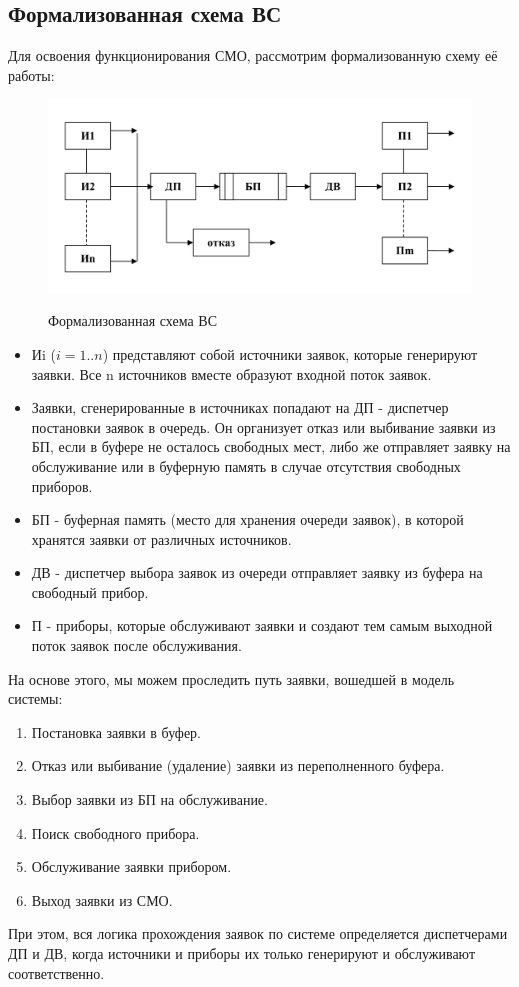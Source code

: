\documentclass[a4paper, 14pt]{article}
\begin{document}
\subsection{Формализованная схема ВС}
Для освоения функционирования СМО, рассмотрим формализованную схему её работы:
\begin{figure}[H]
	\centering
	\includegraphics[width=15cm,height=\textheight,keepaspectratio]{smo.png}\\
	\caption{Формализованная схема ВС}
\end{figure}

\begin{itemize}
	\item Иi ($i=1..n$) представляют собой источники заявок, которые генерируют заявки. Все n источников вместе образуют входной поток заявок.
	\item Заявки, сгенерированные в источниках попадают на ДП - диспетчер постановки заявок в очередь. Он организует отказ или выбивание заявки из БП, если в буфере не осталось свободных мест, либо же отправляет заявку на обслуживание или в буферную память в случае отсутствия свободных приборов.
	\item БП - буферная память (место для хранения очереди заявок),  в которой хранятся заявки от различных источников.
	\item ДВ - диспетчер выбора заявок из очереди отправляет заявку из буфера на свободный прибор.
	\item П - приборы, которые обслуживают заявки и создают тем самым выходной поток заявок после обслуживания.
\end{itemize}

На основе этого, мы можем проследить путь заявки, вошедшей в модель системы:
\begin{enumerate}
	\item Постановка заявки в буфер.
	\item Отказ или выбивание (удаление) заявки из переполненного буфера.
	\item Выбор заявки из БП на обслуживание.
	\item Поиск свободного прибора.
	\item Обслуживание заявки прибором.
	\item Выход заявки из СМО.
\end{enumerate}
При этом, вся логика прохождения заявок по системе определяется диспетчерами ДП и ДВ, когда источники и приборы их только генерируют и обслуживают соответственно.
\end{document}
